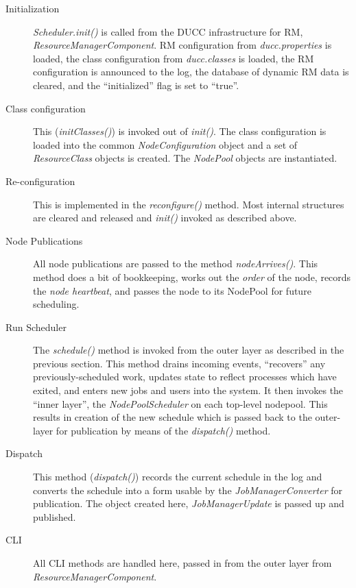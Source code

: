     \begin{description}
      \item[Initialization] {\em Scheduler.init()} is called from the DUCC infrastructure for RM,
        {\em ResourceManagerComponent}.  RM configuration from {\em ducc.properties} is loaded, the
        class configuration from {\em ducc.classes} is loaded, the RM configuration is announced to the
        log, the database of dynamic RM data is cleared, and the ``initialized'' flag is set to ``true''.
      \item[Class configuration] This ({\em initClasses()}) is invoked out of {\em init()}.  The class configuration is loaded
        into the common {\em NodeConfiguration} object and a set of {\em ResourceClass} objects is
        created.  The {\em NodePool} objects are instantiated.
      \item[Re-configuration] This is implemented in the {\em reconfigure()} method.  Most internal structures
        are cleared and released and {\em init()} invoked as described above.
      \item[Node Publications] All node publications are passed to the method {\em nodeArrives()}. This
        method does a bit of bookkeeping, works out the {\em order} of the node, records the {\em node heartbeat},
        and passes the node to its NodePool for future scheduling.
      \item[Run Scheduler] The {\em schedule()} method is invoked from the outer layer as described
        in the previous section.  This method drains incoming events, ``recovers'' any
        previously-scheduled work, updates state to reflect processes which have exited, and enters
        new jobs and users into the system.  It then invokes the ``inner layer'', the {\em
          NodePoolScheduler} on each top-level nodepool.  This results in creation of the new
        schedule which is passed back to the outer-layer for publication by means of the {\em
          dispatch()} method.
      \item[Dispatch] This method ({\em dispatch()}) records the current schedule in the log
        and converts the schedule into a form usable by the {\em JobManagerConverter} for publication. The
        object created here, {\em JobManagerUpdate} is passed up and published.
      \item[CLI] All CLI methods are handled here, passed in from the outer layer from {\em ResourceManagerComponent}.
        
    \end{description}

